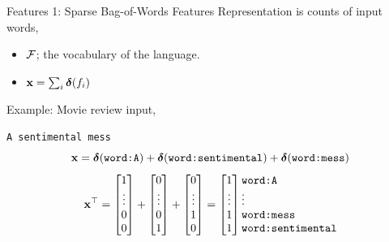 \documentclass{beamer}
\begin{document}
\begin{frame}{Features 1: Sparse Bag-of-Words Features}
  Representation is counts of input words, 
  \begin{itemize}
  \item $\mathcal{F}$; the vocabulary of the language.
  \item $\mathbf{x} = \sum_{i} \boldsymbol{\delta}(f_i)$ 
  \end{itemize}

  Example: Movie review input, 
  \begin{center}
    \texttt{A sentimental mess}
    \[ \mathbf{x} = \boldsymbol{\delta}(\texttt{word:A}) + \boldsymbol{\delta}(\texttt{word:sentimental}) +
    \boldsymbol{\delta}(\texttt{word:mess}) \] 
    \[ \boldx^\top =\begin{bmatrix} 1 \\ \vdots
        \\ 0\\ 0 \\ \end{bmatrix} +\begin{bmatrix} 0 \\
        \vdots \\ 0\\ 1 \\ \end{bmatrix} +
     \begin{bmatrix} 0 \\ \vdots \\ 1\\ 0 \\ \end{bmatrix} 
    =\begin{bmatrix} 1 \\ \vdots \\ 1 \\ 1 \\ \end{bmatrix} 
    \begin{matrix*}[l] \mathrm{\texttt{word:A}} \\ \vdots \\ \mathrm{\texttt{word:mess}} \\ \mathrm{\texttt{word:sentimental}} \\ \end{matrix*}
     \]
  \end{center}
\end{frame}
\end{document}
